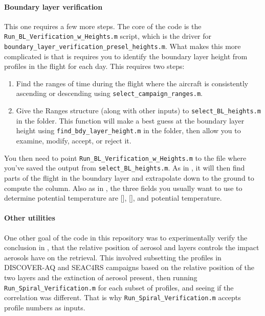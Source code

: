 \documentclass[12pt]{article}
\begin{document}
		\paragraph{Boundary layer verification}
		
		This one requires a few more steps.  The core of the code is the \lstinline$Run_BL_Verification_w_Heights.m$ script, which is the driver for \lstinline$boundary_layer_verification_presel_heights.m$. What makes this more complicated is that is requires you to identify the boundary layer height from profiles in the flight for each day. This requires two steps:
		
		\begin{enumerate}
		\item Find the ranges of time during the flight where the aircraft is consistently ascending or descending using \lstinline$select_campaign_ranges.m$.
		\item Give the Ranges structure (along with other inputs) to \lstinline$select_BL_heights.m$ in the  folder. This function will make a best guess at the boundary layer height using \lstinline$find_bdy_layer_height.m$ in the  folder, then allow you to examine, modify, accept, or reject it.
		\end{enumerate}
		
		You then need to point \lstinline$Run_BL_Verification_w_Heights.m$ to the file where you've saved the output from \lstinline$select_BL_heights.m$. As in \citet{russell11}, it will then find parts of the flight in the boundary layer and extrapolate down to the ground to compute the column. Also as in \citet{russell11}, the three fields you usually want to use to determine potential temperature are [], [], and potential temperature.
		
		\paragraph{Other utilities}
		
		One other goal of the code in this repository was to experimentally verify the conclusion in \citet{bousserez14}, that the relative position of aerosol and  layers controls the impact aerosols have on the  retrieval.  This involved subsetting the profiles in DISCOVER-AQ and SEAC4RS campaigns based on the relative position of the two layers and the extinction of aerosol present, then running \lstinline$Run_Spiral_Verification.m$ for each subset of profiles, and seeing if the correlation was different. That is why \lstinline$Run_Spiral_Verification.m$ accepts profile numbers as inputs.
		
\end{document}
